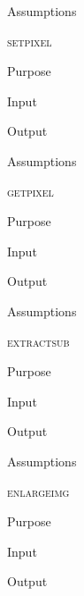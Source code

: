 \documentclass[pdftex, 11pt]{article}
\begin{document}
\begin{description}
\begin{description}
			\item{Assumptions}


		\end{description}



	\item{\textsc{setpixel}}
		\begin{description}
			\item{Purpose}


			\item{Input}


			\item{Output}


			\item{Assumptions}


		\end{description}



	\item{\textsc{getpixel}}
		\begin{description}
			\item{Purpose}


			\item{Input}


			\item{Output}


			\item{Assumptions}


		\end{description}



	\item{\textsc{extractsub}}
		\begin{description}
			\item{Purpose}


			\item{Input}


			\item{Output}


			\item{Assumptions}


		\end{description}



	\item{\textsc{enlargeimg}}
		\begin{description}
			\item{Purpose}


			\item{Input}


			\item{Output}



\end{description}
\end{description}
\end{document}
